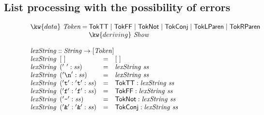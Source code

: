 
\newpage

\subsection{List processing with the possibility of errors}
\label{sec:list-proc-with-errors}

\begin{figure}[t]
  \centering
  \begin{displaymath}
    \begin{array}{l}
      \begin{array}{l@{\hspace{0.2em}}c@{\hspace{0.2em}}l}
        \kw{data}~\mathit{Token} &=& \mathsf{TokTT} \mathrel| \mathsf{TokFF} \mathrel| \mathsf{TokNot} \mathrel| \mathsf{TokConj} \mathrel| \mathsf{TokLParen} \mathrel| \mathsf{TokRParen} \\
        & & \kw{deriving}~\mathit{Show}
      \end{array}\\
      \\
      \begin{array}{l}
        \mathit{lexString} :: \mathit{String} \to [\mathit{Token}] \\
        \begin{array}{@{}l@{\hspace{0.5em}}lcl}
          \mathit{lexString}&[~]&=&[~]\\ 
          \mathit{lexString}&('\ ':\mathit{ss})&=&\mathit{lexString}~\mathit{ss}\\
          \mathit{lexString}&('\texttt{\textbackslash{}n}':\mathit{ss})&=&\mathit{lexString}~\mathit{ss} \\
          \mathit{lexString}&('\texttt{t}':{} '\texttt{t}':\mathit{ss})&=&\mathsf{TokTT} : \mathit{lexString}~\mathit{ss} \\
          \mathit{lexString}&('\texttt{f}':{} '\texttt{f}':\mathit{ss})&=&\mathsf{TokFF} : \mathit{lexString}~\mathit{ss} \\
          \mathit{lexString}&('\texttt{\textasciitilde}':\mathit{ss})&=&\mathsf{TokNot} : \mathit{lexString}~\mathit{ss} \\
          \mathit{lexString}&('\texttt{\&}':{} '\texttt{\&}':\mathit{ss})&=&\mathsf{TokConj} : \mathit{lexString}~\mathit{ss} \\

\end{array}
\end{array}
\end{array}
\end{displaymath}
\end{figure}
